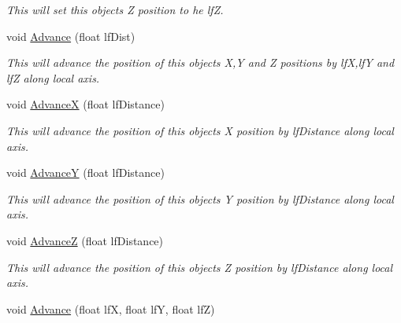 \begin{DoxyCompactItemize}
\begin{DoxyCompactList}\small\item\em This will set this objects Z position to he lfZ. \end{DoxyCompactList}\item 
\hypertarget{classc_camera_matrix4_a6226abdf3731075f95e10704bcc717bf}{
void \hyperlink{classc_camera_matrix4_a6226abdf3731075f95e10704bcc717bf}{Advance} (float lfDist)}
\label{classc_camera_matrix4_a6226abdf3731075f95e10704bcc717bf}

\begin{DoxyCompactList}\small\item\em This will advance the position of this objects X,Y and Z positions by lfX,lfY and lfZ along local axis. \end{DoxyCompactList}\item 
\hypertarget{classc_camera_matrix4_a4a07cdf5cb578378193487a1ac304380}{
void \hyperlink{classc_camera_matrix4_a4a07cdf5cb578378193487a1ac304380}{AdvanceX} (float lfDistance)}
\label{classc_camera_matrix4_a4a07cdf5cb578378193487a1ac304380}

\begin{DoxyCompactList}\small\item\em This will advance the position of this objects X position by lfDistance along local axis. \end{DoxyCompactList}\item 
\hypertarget{classc_camera_matrix4_a1c644144c6673fad0d45ac2a28065edb}{
void \hyperlink{classc_camera_matrix4_a1c644144c6673fad0d45ac2a28065edb}{AdvanceY} (float lfDistance)}
\label{classc_camera_matrix4_a1c644144c6673fad0d45ac2a28065edb}

\begin{DoxyCompactList}\small\item\em This will advance the position of this objects Y position by lfDistance along local axis. \end{DoxyCompactList}\item 
\hypertarget{classc_camera_matrix4_a18915056c461b31b5ea916715fa2582f}{
void \hyperlink{classc_camera_matrix4_a18915056c461b31b5ea916715fa2582f}{AdvanceZ} (float lfDistance)}
\label{classc_camera_matrix4_a18915056c461b31b5ea916715fa2582f}

\begin{DoxyCompactList}\small\item\em This will advance the position of this objects Z position by lfDistance along local axis. \end{DoxyCompactList}\item 
\hypertarget{classc_camera_matrix4_acd0e691c270f18c80965bf8da4442d5b}{
void \hyperlink{classc_camera_matrix4_acd0e691c270f18c80965bf8da4442d5b}{Advance} (float lfX, float lfY, float lfZ)}
\label{classc_camera_matrix4_acd0e691c270f18c80965bf8da4442d5b}


\end{DoxyCompactItemize}
